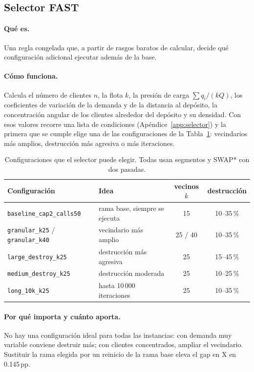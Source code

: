 \documentclass[11pt,a4paper]{article}
\newcommand{\pp}{\,pp}
\newcommand{\tsl}[1]{\texttt{\small #1}}
\begin{document}
\subsection{Selector FAST}
\label{sec:fast}

\paragraph{Qué es.} Una regla congelada que, a partir de rasgos baratos de calcular, decide qué
configuración adicional ejecutar además de la base.

\paragraph{Cómo funciona.} Calcula el número de clientes $n$, la flota $k$, la presión de carga
$\sum q_i/(kQ)$, los coeficientes de variación de la demanda y de la distancia al depósito, la
concentración angular de los clientes alrededor del depósito y su densidad. Con esos valores recorre
una lista de condiciones (Apéndice~\ref{app:selector}) y la primera que se cumple elige una de las
configuraciones de la Tabla~\ref{tab:ramas}: vecindarios más amplios, destrucción más agresiva o más
iteraciones.

\begin{table}[H]
\centering
\caption{Configuraciones que el selector puede elegir. Todas usan segmentos y SWAP* con dos pasadas.}
\label{tab:ramas}
\small
\begin{tabular}{@{}llcc@{}}
\toprule
Configuración & Idea & vecinos $k$ & destrucción \\
\midrule
\tsl{baseline\_cap2\_calls50} & rama base, siempre se ejecuta & 15 & 10--35\,\% \\
\tsl{granular\_k25} / \tsl{granular\_k40} & vecindario más amplio & 25 / 40 & 10--35\,\% \\
\tsl{large\_destroy\_k25} & destrucción más agresiva & 25 & 15--45\,\% \\
\tsl{medium\_destroy\_k25} & destrucción moderada & 25 & 10--25\,\% \\
\tsl{long\_10k\_k25} & hasta 10\,000 iteraciones & 25 & 10--35\,\% \\
\bottomrule
\end{tabular}
\end{table}

\paragraph{Por qué importa y cuánto aporta.} No hay una configuración ideal para todas las
instancias: con demanda muy variable conviene destruir más; con clientes concentrados, ampliar el
vecindario. Sustituir la rama elegida por un reinicio de la rama base eleva el gap en X en 0.145\pp{}.
\end{document}
